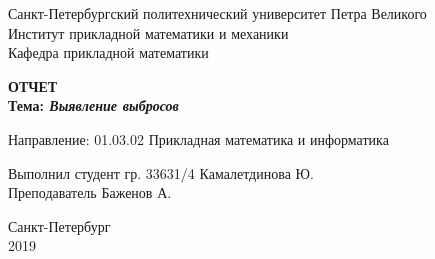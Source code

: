 \begin{titlepage}

\begin{center}
Санкт-Петербургский политехнический университет Петра Великого\\
Институт прикладной математики и механики\\
Кафедра прикладной математики\\
\end{center}


\vspace{2.5cm}

\begin{center}
{\large {\bfseries ОТЧЕТ}}\\

\bigskip \bfseries{Тема:} {\bfseries \emph{Выявление выбросов}}
\end{center}

\vspace{1.5cm}

\begin{flushleft}
Направление: 01.03.02 Прикладная математика и информатика

\vspace{1.5cm}

Выполнил студент гр. 33631/4 \hfill{Камалетдинова Ю.} \\ 

\vspace{0.5cm} Преподаватель \hfill{Баженов А.}
\vspace{1cm}

\end{flushleft}

\vspace{2.7cm}

\begin{center}
Санкт-Петербург\\
2019
\end{center}

\end{titlepage}
